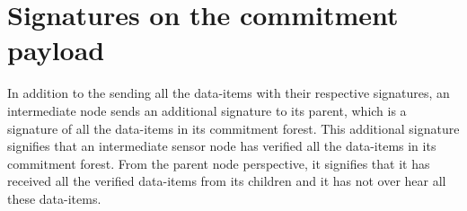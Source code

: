 	\section{Signatures on the commitment payload}
		In addition to the sending all the data-items with their respective signatures, an intermediate node sends an additional signature to its parent, which is a signature of all the data-items in its commitment forest.
		This additional signature signifies that an intermediate sensor node has verified all the data-items in its commitment forest.
		From the parent node perspective, it signifies that it has received all the verified data-items from its children and it has not over hear all these data-items.
		
